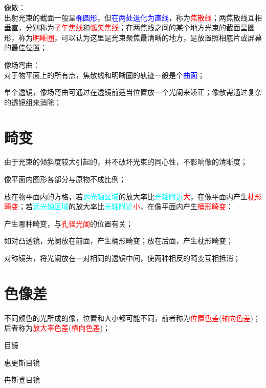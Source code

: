 \documentclass[12pt,a4paper]{article}
\begin{document}
像散：\\
出射光束的截面一般呈\textcolor{blue}{椭圆形}，但\textcolor{blue}{在两处退化为直线}，称为\textcolor{red}{焦散线}；两焦散线互相垂直，分别称为\textcolor{red}{子午焦线}和\textcolor{red}{弧矢焦线}；在两焦线之间的某个地方光束的截面呈圆形，称为\textcolor{red}{明晰圈}，可以认为这里是光束聚焦最清晰的地方，是放置照相底片或屏幕的最佳位置；


像场弯曲：\\
对于物平面上的所有点，焦散线和明晰圈的轨迹一般是个\textcolor{blue}{曲面}；

单个透镜，像场弯曲可通过在透镜前适当位置放一个光阑来矫正；像散需通过复杂的透镜组来消除；


\section{畸变}
由于光束的倾斜度较大引起的，并不破坏光束的同心性，不影响像的清晰度；

像平面内图形各部分与原物不成比例；

放在物平面内的方格，若\textcolor{cyan}{远光轴区域}的放大率比\textcolor{cyan}{光轴附近}\textcolor{red}{大}，在像平面内产生\textcolor{red}{枕形畸变}；若\textcolor{cyan}{远光轴区域}的放大率比\textcolor{cyan}{光轴附近}\textcolor{red}{小}，在像平面内产生\textcolor{red}{桶形畸变}：

产生哪种畸变，与\textcolor{red}{孔径光阑}的位置有关；


如对凸透镜，光阑放在前面，产生桶形畸变；放在后面，产生枕形畸变；

对称镜头，将光阑放在一对相同的透镜中间，使两种相反的畸变互相抵消；

\section{色像差}
不同颜色的光所成的像，位置和大小都可能不同，前者称为\textcolor{red}{位置色差}(\textcolor{red}{轴向色差})；后者称为\textcolor{red}{放大率色差}(\textcolor{red}{横向色差})；






目镜

惠更斯目镜


冉斯登目镜
\end{document}
